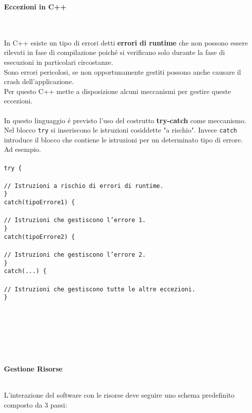 \documentclass{article}
\newcommand\tab[1][1cm]{\hspace*{#1}}
\begin{document}
\textcolor{grigio}{\begin{large}\textbf{Eccezioni in C++}\end{large}\\
\\In C++ esiste un tipo di errori detti \textbf{errori di runtime} che non possono essere rilevati in fase di compilazione poich\'e si verificano solo durante la fase di esecuzioni in particolari circostanze.\\Sono errori pericolosi, se non opportunamente gestiti possono anche causare il crash dell'applicazione.
\\Per questo C++ mette a disposizione alcuni meccanismi per gestire queste eccezioni.\\ \\In questo linguaggio \'e previsto l'uso del costrutto \textbf{try-catch} come meccanismo.
\\ Nel blocco \texttt{try} si inseriscono le istruzioni cosiddette "a rischio". Invece \texttt{catch} introduce il blocco che contiene le istruzioni per un determinato tipo di errore. Ad esempio.\\ \\ \texttt{try \{ \\ \\ \tab // Istruzioni a rischio di errori di runtime. \\ \} \\ catch(tipoErrore1) \{ \\ \\ \tab // Istruzioni che gestiscono l'errore 1. \\ \} \\ catch(tipoErrore2) \{ \\ \\ \tab // Istruzioni che gestiscono l'errore 2. \\ \} \\ catch(...) \{ \\ \\ \tab // Istruzioni che gestiscono tutte le altre eccezioni. \\ \}}}
\\ \\ \\ \\ \\
\begin{large}\textbf{\textcolor{blu}{Gestione Risorse}}\\ \\ \end{large}
L'interazione del software con le risorse deve seguire uno schema predefinito composto da 3 passi:\\
\end{document}
